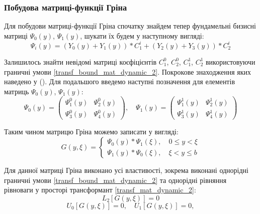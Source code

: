 \subsubsection{Побудова матриці-функції Гріна}
Для побудови матриці-функції Гріна спочатку знайдем тепер фундамельні бизисні матриці $\Psi_0(y)$, $\Psi_1(y)$, шукати їх будем у наступному вигляді:
\begin{equation}\label{psi_dynamic_2}
    \Psi_i(y) = \left( Y_0(y) + Y_1(y) \right) * C_1^i + \left( Y_2(y) + Y_3(y) \right) * C_2^i
\end{equation}

Залишилось знайти невідомі матриці коєфіцієнтів $C_1^0$, $C_2^0$, $C_1^1$, $C_2^1$ використовуючи граничні умови \eqref{transf_bound_mat_dynamic_2}.
Покрокове знаходження яких наведено у ().
Для подальшого введемо наступні позначення для елементів матриць $\Psi_0(y)$, $\Psi_1(y)$:
\begin{equation*}
    \Psi_0(y) = \begin{pmatrix}
        \Psi_1^0(y) &  \Psi_2^0(y) \\
        \Psi_3^0(y) &  \Psi_4^0(y) 
    \end{pmatrix}, \quad 
    \Psi_1(y) = \begin{pmatrix}
        \Psi_1^1(y) &  \Psi_2^1(y) \\
        \Psi_3^1(y) &  \Psi_4^1(y) 
    \end{pmatrix}      
\end{equation*}

Таким чином матрицю Гріна можемо записати у вигляді:
\begin{equation}
    G(y,\xi) = 
    \begin{cases}
        \Psi_0(y) * \Psi_1(\xi), \quad 0 \le y < \xi \\
        \Psi_1(y) * \Psi_0(\xi), \quad \xi < y \le b
    \end{cases}
\end{equation}

Для данної матриці Гріна виконано усі властивості, зокрема виконані однорідні граничні умови \eqref{transf_bound_mat_dynamic_2}
та однорідні рівняння рівноваги у просторі трансформант \eqref{transf_mat_dynamic_2}:
\begin{equation*}
    L_2\left[  G(y, \xi) \right] = 0
\end{equation*}
\begin{equation*}
    U_0\left[ G(y, \xi) \right] = 0, \quad  U_1\left[ G(y, \xi) \right] = 0,
\end{equation*}

